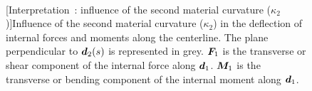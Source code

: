 \begin{figure}[p]
  \begin{leftfullpage}
    \captionsetup[subfloat]{captionskip=10pt}
     	\centering
     	 \\
	\vspace{30pt}
	\vspace{30pt}
	[Interpretation~: influence of the second material curvature ($\kappa_2$)]{Influence of the second material curvature ($\kappa_2$) in the deflection of internal forces and moments along the centerline. The plane perpendicular to $\boldsymbol{d}_2(s)$ is represented in grey. $\boldsymbol{F}_1$ is the transverse or shear component of the internal force along $\boldsymbol{d}_1$. $\boldsymbol{M}_1$ is the transverse or bending component of the internal moment along $\boldsymbol{d}_1$.}
	\label{fig:d2}
 \end{leftfullpage}
\end{figure}
